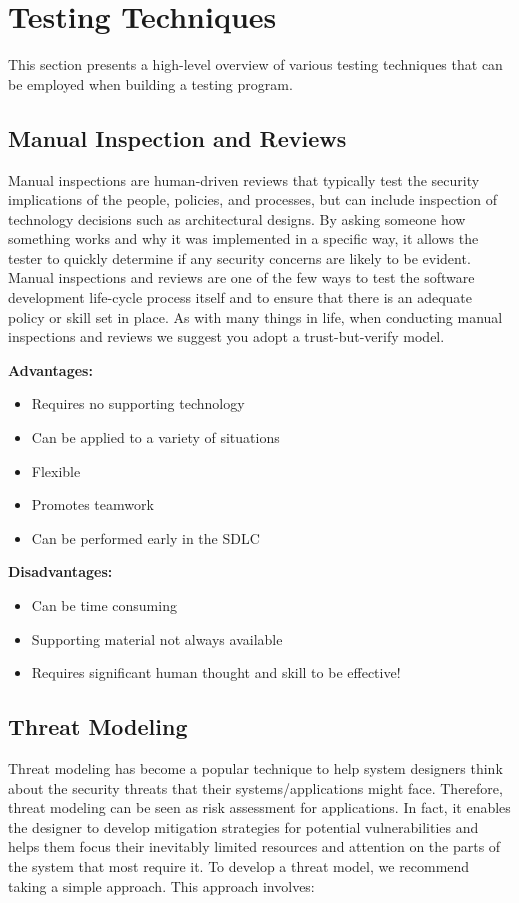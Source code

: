 	\clearpage
	\section{Testing Techniques}

		This section presents a high-level overview of various testing techniques that 
		can be employed when building a testing program.

		\subsection{Manual Inspection and Reviews}
			Manual inspections are human-driven reviews that typically test the security
			implications of the people, policies, and processes, but can include inspection 
			of technology decisions such as architectural designs.
			By asking someone how something works and why it was implemented in a specific way, 
			it allows the tester to quickly determine if any security concerns are likely to 
			be evident. Manual inspections and reviews are one of the few ways to test
			the software development life-cycle process itself and to ensure that there is 
			an adequate policy or skill set in place. 
			As with many things in life, when conducting manual inspections and reviews we suggest you adopt a trust-but-verify model. 

			{\bf Advantages:}
			\begin{itemize}
				\item Requires no supporting technology
				\item Can be applied to a variety of situations
				\item Flexible
				\item Promotes teamwork
				\item Can be performed early in the SDLC
			\end{itemize}

			{\bf Disadvantages:}
			\begin{itemize}
				\item Can be time consuming
				\item Supporting material not always available
				\item Requires significant human thought and skill to be effective!
			\end{itemize}

		\clearpage
		\subsection{Threat Modeling}
			Threat modeling has become a popular technique to help system designers think 
			about the security threats that their systems/applications might face. 
			Therefore, threat modeling can be seen as risk assessment for applications. 
			In fact, it enables the designer to develop mitigation strategies for potential
			vulnerabilities and helps them focus their inevitably limited resources and 
			attention on the parts of the system that most require it.
			To develop a threat model, we recommend taking a simple approach.
			This approach involves:

